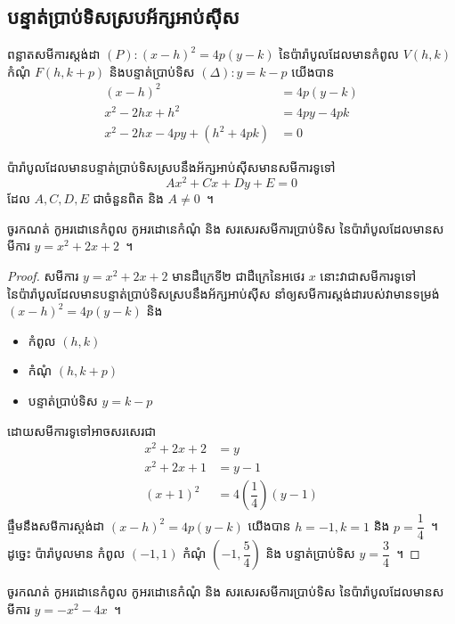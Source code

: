 \subsection{បន្ទាត់ប្រាប់ទិសស្របអ័ក្សអាប់ស៊ីស}
ពន្លាតសមីការស្ដង់ដា $ (P):(x-h)^2=4p(y-k) $ នៃប៉ារ៉ាបូលដែលមានកំពូល $ V(h,k) $ កំណុំ $ F(h,k+p) $ និងបន្ទាត់ប្រាប់ទិស $ (\Delta):y=k-p $ យើងបាន
\begin{align*}
	(x-h)^2 &=4p(y-k)\\
	x^2-2hx+h^2 &= 4py-4pk\\
	x^2-2hx-4py+(h^2+4pk) &=0
\end{align*}
%
\begin{generality}
	ប៉ារ៉ាបូលដែលមានបន្ទាត់ប្រាប់ទិសស្របនឹងអ័ក្សអាប់ស៊ីសមានសមីការទូទៅ
	\begin{equation}
		Ax^2+Cx+Dy+E=0
	\end{equation}
	ដែល $ A,C,D,E $ ជាចំនួនពិត និង $ A\neq 0 $~។
\end{generality}
%
\begin{example}
	ចូរកណត់ កូអរដោនេ​កំពូល កូអរដោនេ​កំណុំ និង សរសេរសមីការប្រាប់ទិស នៃប៉ារ៉ាបូលដែលមានសមីការ $ y=x^2+2x+2 $~។
\end{example}
%
\begin{proof}
	សមីការ $ y=x^2+2x+2 $ មានដឺក្រេទី២ ជាដឺក្រេនៃអថេរ $ x $ នោះវាជាសមីការទូទៅនៃប៉ារ៉ាបូលដែលមានបន្ទាត់ប្រាប់ទិសស្របនឹងអ័ក្សអាប់ស៊ីស នាំឲ្យសមីការស្តង់ដារបស់វាមានទម្រង់ $ (x-h)^2=4p(y-k) $ និង
	\begin{itemize}
		\item កំពូល $ (h,k) $
		\item កំណុំ $ (h,k+p) $
		\item បន្ទាត់ប្រាប់ទិស $ y=k-p $
	\end{itemize}
	ដោយសមីការទូទៅអាចសរសេរជា
	\begin{align*}
		x^2+2x+2 &=y\\
		x^2+2x+1 &=y-1\\
		(x+1)^2 &=4\left(\dfrac{1}{4}\right)(y-1)
	\end{align*}
	ផ្ទឹមនឹងសមីការស្តង់ដា $ (x-h)^2=4p(y-k) $ យើងបាន $ h=-1,k=1 $ និង $ p=\dfrac{1}{4} $~។ ដូច្នេះ ប៉ារ៉ាបូលមាន​ កំពូល $ (-1,1) $ កំណុំ $ \left(-1,\dfrac{5}{4}\right) $ និង បន្ទាត់ប្រាប់ទិស $ y=\dfrac{3}{4} $~។
\end{proof}
%
\begin{example}
	ចូរកណត់ កូអរដោនេ​កំពូល កូអរដោនេ​កំណុំ និង សរសេរសមីការប្រាប់ទិស នៃប៉ារ៉ាបូលដែលមានសមីការ $ y=-x^2-4x $~។
\end{example}
%

